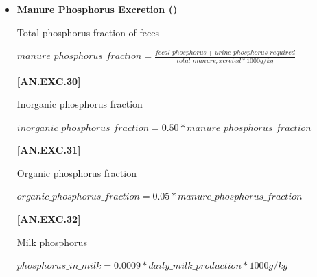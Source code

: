 \begin{refsection}
\begin{itemize}
            {\raggedleft \textbf{[AN.EXC.6]}\par}
            \vspace{0.5cm}

        \item \textbf{Manure Phosphorus Excretion ()}

Total phosphorus fraction of feces
        \vspace{0.5cm}
    
    \begin{center}
        \(manure\_phosphorus\_fraction = \frac{fecal\_phosphorus + urine\_phosphorus\_required}{total\_manure_excreted * 1000 g/kg}\)
    \end{center}
        \vspace{0.5cm} 
    
            {\raggedleft \textbf{[AN.EXC.30]}\par}
            \vspace{0.5cm}

Inorganic phosphorus fraction 
        \vspace{0.5cm}
    
    \begin{center}
        \(inorganic\_phosphorus\_fraction = 0.50 * manure\_phosphorus\_fraction\)
    \end{center}
        \vspace{0.5cm} 
    
            {\raggedleft \textbf{[AN.EXC.31]}\par}
            \vspace{0.5cm}

Organic phosphorus fraction 
        \vspace{0.5cm}
    
    \begin{center}
        \(organic\_phosphorus\_fraction = 0.05 * manure\_phosphorus\_fraction \)
    \end{center}
        \vspace{0.5cm} 
    
            {\raggedleft \textbf{[AN.EXC.32]}\par}
            \vspace{0.5cm}
            
Milk phosphorus
        \vspace{0.5cm}
    
    \begin{center}
        \(phosphorus\_in\_milk =0.0009 * daily\_milk\_production * 1000g/kg\)
    \end{center}
        \vspace{0.5cm} 
    

\end{itemize}
\end{refsection}
